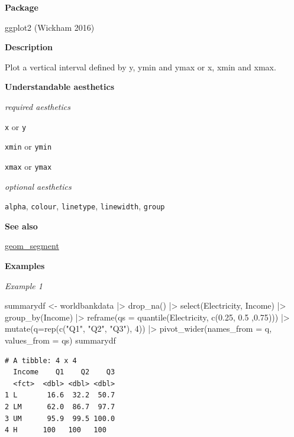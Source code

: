 \documentclass[
  letterpaper,
  DIV=11,
  numbers=noendperiod]{scrreprt}
\newenvironment{Shaded}{\begin{snugshade}}{\end{snugshade}}
\newcommand{\AttributeTok}[1]{\textcolor[rgb]{0.40,0.45,0.13}{#1}}
\newcommand{\DecValTok}[1]{\textcolor[rgb]{0.68,0.00,0.00}{#1}}
\newcommand{\FloatTok}[1]{\textcolor[rgb]{0.68,0.00,0.00}{#1}}
\newcommand{\FunctionTok}[1]{\textcolor[rgb]{0.28,0.35,0.67}{#1}}
\newcommand{\NormalTok}[1]{\textcolor[rgb]{0.00,0.23,0.31}{#1}}
\newcommand{\OtherTok}[1]{\textcolor[rgb]{0.00,0.23,0.31}{#1}}
\newcommand{\SpecialCharTok}[1]{\textcolor[rgb]{0.37,0.37,0.37}{#1}}
\newcommand{\StringTok}[1]{\textcolor[rgb]{0.13,0.47,0.30}{#1}}
\begin{document}
\textbf{Package}

ggplot2 (Wickham 2016)

\textbf{Description}

Plot a vertical interval defined by y, ymin and ymax or x, xmin and
xmax.

\textbf{Understandable aesthetics}

\emph{required aesthetics}

\texttt{x} or \texttt{y}

\texttt{xmin} or \texttt{ymin}

\texttt{xmax} or \texttt{ymax}

\emph{optional aesthetics}

\texttt{alpha}, \texttt{colour}, \texttt{linetype}, \texttt{linewidth},
\texttt{group}

\textbf{See also}

\hyperref[segment]{geom\_segment}

\textbf{Examples}

\emph{Example 1}

\begin{Shaded}
\begin{Highlighting}[]
\NormalTok{summarydf }\OtherTok{\textless{}{-}}\NormalTok{ worldbankdata }\SpecialCharTok{|\textgreater{}}
  \FunctionTok{drop\_na}\NormalTok{() }\SpecialCharTok{|\textgreater{}}
  \FunctionTok{select}\NormalTok{(Electricity, Income) }\SpecialCharTok{|\textgreater{}}
  \FunctionTok{group\_by}\NormalTok{(Income) }\SpecialCharTok{|\textgreater{}}
  \FunctionTok{reframe}\NormalTok{(}\AttributeTok{qs =} \FunctionTok{quantile}\NormalTok{(Electricity, }\FunctionTok{c}\NormalTok{(}\FloatTok{0.25}\NormalTok{, }\FloatTok{0.5}\NormalTok{ ,}\FloatTok{0.75}\NormalTok{))) }\SpecialCharTok{|\textgreater{}}
  \FunctionTok{mutate}\NormalTok{(}\AttributeTok{q=}\FunctionTok{rep}\NormalTok{(}\FunctionTok{c}\NormalTok{(}\StringTok{"Q1"}\NormalTok{, }\StringTok{"Q2"}\NormalTok{, }\StringTok{"Q3"}\NormalTok{), }\DecValTok{4}\NormalTok{)) }\SpecialCharTok{|\textgreater{}}
  \FunctionTok{pivot\_wider}\NormalTok{(}\AttributeTok{names\_from =}\NormalTok{ q,}
              \AttributeTok{values\_from =}\NormalTok{ qs)}
\NormalTok{summarydf}
\end{Highlighting}
\end{Shaded}

\begin{verbatim}
# A tibble: 4 x 4
  Income    Q1    Q2    Q3
  <fct>  <dbl> <dbl> <dbl>
1 L       16.6  32.2  50.7
2 LM      62.0  86.7  97.7
3 UM      95.9  99.5 100.0
4 H      100   100   100  
\end{verbatim}
\end{document}
